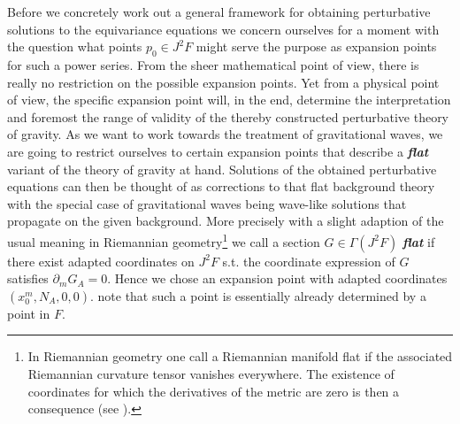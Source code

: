 \documentclass[a4paper,12pt, DIV=14, BCOR=5mm, twoside, headsepline, numbers=noenddot]{scrbook}
\begin{document}
Before we concretely work out a general framework for obtaining perturbative solutions to the equivariance equations we concern ourselves for a moment with the question what points $p_0 \in J^2F$ might serve the purpose as expansion points for such a power series. From the sheer mathematical point of view, there is really no restriction on the possible expansion points. Yet from a physical point of view, the specific expansion point will, in the end, determine the interpretation and foremost the range of validity of the thereby constructed perturbative theory of gravity. As we want to work towards the treatment of gravitational waves, we are going to restrict ourselves to certain expansion points that describe a \textit{\textbf{flat}} variant of the theory of gravity at hand. Solutions of the obtained perturbative equations can then be thought of as corrections to that flat background theory with the special case of gravitational waves being wave-like solutions that propagate on the given background. More precisely with a slight adaption of the usual meaning in Riemannian geometry\footnote{In Riemannian geometry one call a Riemannian manifold flat if the associated Riemannian curvature tensor vanishes everywhere. The existence of coordinates for which the derivatives of the metric are zero is then a consequence (see \cite{petersen2006riemannian}).} we call a section $G \in \Gamma(J^2F)$ \textit{\textbf{flat}} if there exist adapted coordinates on $J^2F$ s.t. the coordinate expression of $G$ satisfies $\partial_mG_{A}=0$.
Hence we chose an expansion point with adapted coordinates $(x_0^m,N_A,0,0)$. note that such a point is essentially already determined by a point in $F$. 
\end{document}
